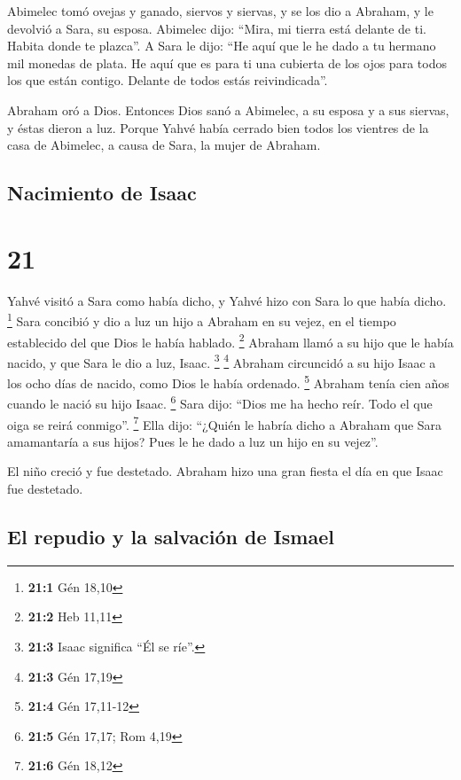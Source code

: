  Abimelec tomó ovejas y ganado, siervos y siervas, y se
los dio a Abraham, y le devolvió a Sara, su esposa. 
Abimelec dijo: ``Mira, mi tierra está delante de ti. Habita donde te
plazca''.  A Sara le dijo: ``He aquí que le he dado a tu
hermano mil monedas de plata. He aquí que es para ti una cubierta de los
ojos para todos los que están contigo. Delante de todos estás
reivindicada''.

 Abraham oró a Dios. Entonces Dios sanó a Abimelec, a su
esposa y a sus siervas, y éstas dieron a luz.  Porque
Yahvé había cerrado bien todos los vientres de la casa de Abimelec, a
causa de Sara, la mujer de Abraham.

\hypertarget{nacimiento-de-isaac}{%
\subsection{Nacimiento de Isaac}\label{nacimiento-de-isaac}}

\hypertarget{section-20}{%
\section{21}\label{section-20}}

 Yahvé visitó a Sara como había dicho, y Yahvé hizo con
Sara lo que había dicho. \footnote{\textbf{21:1} Gén 18,10}
 Sara concibió y dio a luz un hijo a Abraham en su vejez,
en el tiempo establecido del que Dios le había hablado. \footnote{\textbf{21:2}
  Heb 11,11}  Abraham llamó a su hijo que le había nacido,
y que Sara le dio a luz, Isaac. \footnote{\textbf{21:3} Isaac significa
  ``Él se ríe''.} \footnote{\textbf{21:3} Gén 17,19} 
Abraham circuncidó a su hijo Isaac a los ocho días de nacido, como Dios
le había ordenado. \footnote{\textbf{21:4} Gén 17,11-12} 
Abraham tenía cien años cuando le nació su hijo Isaac. \footnote{\textbf{21:5}
  Gén 17,17; Rom 4,19}  Sara dijo: ``Dios me ha hecho
reír. Todo el que oiga se reirá conmigo''. \footnote{\textbf{21:6} Gén
  18,12}  Ella dijo: ``¿Quién le habría dicho a Abraham
que Sara amamantaría a sus hijos? Pues le he dado a luz un hijo en su
vejez''.

 El niño creció y fue destetado. Abraham hizo una gran
fiesta el día en que Isaac fue destetado.

\hypertarget{el-repudio-y-la-salvaciuxf3n-de-ismael}{%
\subsection{El repudio y la salvación de
Ismael}\label{el-repudio-y-la-salvaciuxf3n-de-ismael}}

